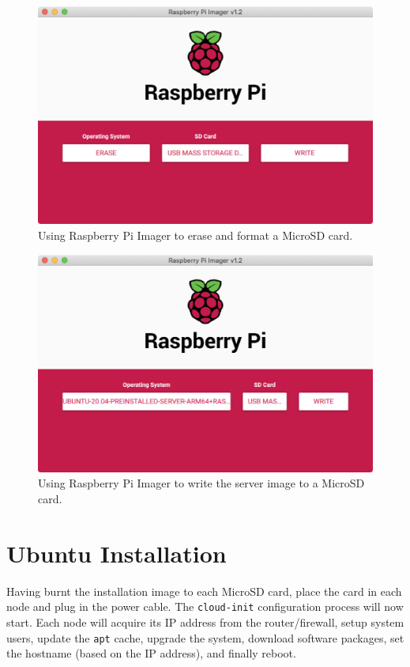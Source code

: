 \documentclass{report}
\begin{document}
\begin{figure}[H]
	\centering	
	\includegraphics[width=1.0\textwidth]{screenshots/imager-erase.png}
	\caption{Using Raspberry Pi Imager to erase and format a MicroSD card.}
\end{figure}

\begin{figure}[H]
	\centering	
	\includegraphics[width=1.0\textwidth]{screenshots/imager-write.png}
	\caption{Using Raspberry Pi Imager to write the server image to a MicroSD card.}
\end{figure}



%
%
\section{Ubuntu Installation}

Having burnt the installation image to each MicroSD card, place the card in each node and plug in the power cable. The \verb|cloud-init| configuration process will now start. Each node will acquire its IP address from the router/firewall, setup system users, update the \verb|apt| cache, upgrade the system, download software packages, set the hostname (based on the IP address), and finally reboot.
\end{document}
